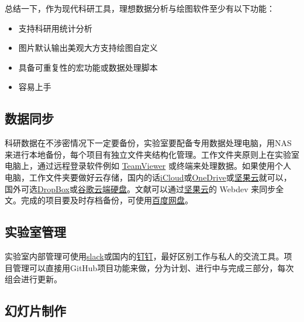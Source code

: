 \documentclass[]{tufte-book}
\providecommand{\tightlist}{%
  \setlength{\itemsep}{0pt}\setlength{\parskip}{0pt}}
\begin{document}
总结一下，作为现代科研工具，理想数据分析与绘图软件至少有以下功能：

\begin{itemize}
\tightlist
\item
  支持科研用统计分析
\item
  图片默认输出美观大方支持绘图自定义
\item
  具备可重复性的宏功能或数据处理脚本
\item
  容易上手
\end{itemize}

\hypertarget{ux6570ux636eux540cux6b65}{%
\subsection*{数据同步}\label{ux6570ux636eux540cux6b65}}

科研数据在不涉密情况下一定要备份，实验室要配备专用数据处理电脑，用NAS来进行本地备份，每个项目有独立文件夹结构化管理。工作文件夹原则上在实验室电脑上，通过远程登录软件例如 \href{https://www.teamviewer.com/en-us/}{TeamViewer} 或终端来处理数据。如果使用个人电脑，工作文件夹要做好云存储，国内的话\href{https://www.icloud.com/}{iCloud}或\href{https://onedrive.live.com/about/en-us/}{OneDrive}或\href{https://www.jianguoyun.com/\#/}{坚果云}就可以，国外可选\href{https://www.dropbox.com/}{DropBox}或\href{https://drive.google.com/drive/my-drive}{谷歌云端硬盘}。文献可以通过\href{https://www.jianguoyun.com/\#/}{坚果云}的 Webdev 来同步全文。完成的项目要及时存档备份，可使用\href{https://pan.baidu.com/}{百度网盘}。

\hypertarget{ux5b9eux9a8cux5ba4ux7ba1ux7406}{%
\subsection*{实验室管理}\label{ux5b9eux9a8cux5ba4ux7ba1ux7406}}

实验室内部管理可使用\href{https://slack.com/}{slack}或国内的\href{https://www.dingtalk.com/}{钉钉}，最好区别工作与私人的交流工具。项目管理可以直接用GitHub项目功能来做，分为计划、进行中与完成三部分，每次组会进行更新。

\hypertarget{ux5e7bux706fux7247ux5236ux4f5c}{%
\subsection*{幻灯片制作}\label{ux5e7bux706fux7247ux5236ux4f5c}}
\end{document}

